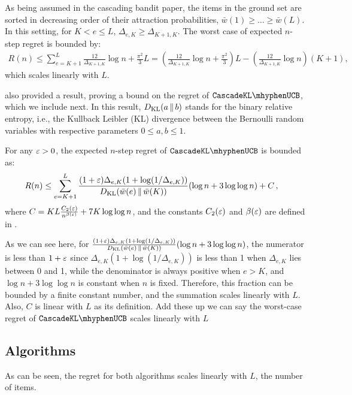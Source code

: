 As being assumed in the cascading bandit paper, the items in the ground set are sorted in decreasing order of their attraction probabilities, $\bar{w}(1) \geq \ldots \geq \bar{w}(L)$. In this setting, for $K < e \leq L$, $\Delta_{e,K} \geq \Delta_{K+1,K}$. The worst case of expected $n$-step regret is bounded by:
\begin{align*}
 R(n) \leq \sum_{e = K + 1}^L \frac{12}{\Delta_{K+1, K}} \log n + \frac{\pi^2}{3} L
 = (\frac{12}{\Delta_{K+1, K}} \log n + \frac{\pi^2}{3}) L - (\frac{12}{\Delta_{K+1, K}} \log n)(K+1) ,
\end{align*}
which scales linearly with $L$.


\citet{kveton15cascade}  also provided a result, proving a bound on the regret of $\cascadeklucb$, which we include next.
In this result, $D_\mathrm{KL}(a \,\|\, b)$ stands for the binary relative entropy, i.e., the Kullback Leibler (KL) divergence between the Bernoulli random variables with respective parameters $0\le a,b\le 1$.
\begin{theorem}
\label{thm:klucb} For any $\varepsilon > 0$, the expected $n$-step regret of $\cascadeklucb$ is bounded as:
\begin{align*}
  R(n)
  & \leq \sum_{e = K + 1}^L
  \frac{(1 + \varepsilon) \Delta_{e, K} (1 + \log(1 / \Delta_{e, K}))}{D_\mathrm{KL}(\bar{w}(e) \,\|\, \bar{w}(K))} (\log n + 3 \log \log n) + C\,,
\end{align*}
where $C = K L \frac{C_2(\varepsilon)}{n^{\beta(\varepsilon)}} + 7 K \log \log n$, and the constants $C_2(\varepsilon)$ and $\beta(\varepsilon)$ are defined in \citet{garivier11klucb}.
\end{theorem}
As we can see here, for $\frac{(1 + \varepsilon) \Delta_{e, K} (1 + \log(1 / \Delta_{e, K}))}{D_\mathrm{KL}(\bar{w}(e) \,\|\, \bar{w}(K))} (\log n + 3 \log \log n)$,
the numerator is less than $1 + \varepsilon$ since $\Delta_{e, K} (1 + \log(1 / \Delta_{e, K}))$ is less than 1 when $\Delta_{e, K}$ lies between 0 and 1,
while the denominator is always positive when $e > K$, and $\log n + 3 \log \log n$ is constant when $n$ is fixed. Therefore, this fraction can be bounded
by a finite constant number, and the summation scales linearly with $L$. Also, $C$ is linear with $L$ as its definition. Add these up we can say
the worst-case regret of $\cascadeklucb$ scales linearly with $L$

\subsection{Algorithms}
\label{sec:algorithms}
As can be seen, the regret for both algorithms scales linearly with $L$, the number of items.


